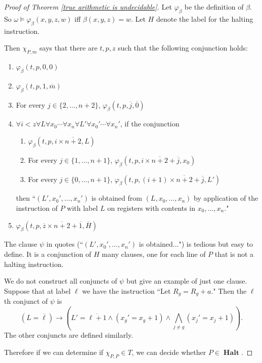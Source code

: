 \documentclass[12pt]{report}
\DeclareMathOperator{\Halt}{\mathbf{Halt}}
\theoremstyle{definition}
\begin{document}
\begin{proof}[Proof of Theorem \ref{true arithmetic is undecidable}]
Let $\varphi_\beta$ be the definition of $\beta$. So $\omega \models \varphi_\beta(x, y, z, w)$ iff $\beta(x, y, z) = w$. Let $H$ denote the label for the halting instruction.

Then $\chi_{P,m}$ says that there are $t,p,z$ such that the following conjunction holds:
\begin{enumerate}
\item $\varphi_\beta(t, p, 0, 0)$
\item $\varphi_\beta(t, p, 1, \overline m)$
\item For every $j \in \{2, \dots, n+2\}$, $\varphi_\beta(t, p, \overline j, \overline 0)$
\item $\forall i < z \forall L \forall x_0 \cdots \forall x_n \forall L' \forall x_0' \cdots \forall x_n'$, if the conjunction
\begin{enumerate}
\item $\varphi_\beta(t, p, i \times \overline{n+2}, L)$
\item For every $j \in \{1, \dots, n+1\}$, $\varphi_\beta(t, p, i \times \overline{n+2} + \overline j, x_0)$
\item For every $j \in \{0, \dots, n+1\}$, $\varphi_\beta(t, p, (i+1) \times \overline{n+2} + \overline j, L')$
\end{enumerate}
then ``$(L', x_0', \dots, x_n')$ is obtained from $(L, x_0, \dots, x_n)$ by application of the instruction of $P$ with label $L$ on registers with contents in $x_0, \dots, x_n$."
\item $\varphi_\beta(t, p, \overline z \times \overline{n+2} + \overline 1, \overline H)$
\end{enumerate}
The clause $\psi$ in quotes (``$(L', x_0', \dots, x_n')$ is obtained...") is tedious but easy to define. It is a conjunction of $H$ many clauses, one for each line of $P$ that is not a halting instruction.

We do not construct all conjuncts of $\psi$ but give an example of just one clause. Suppose that at label $\ell$ we have the instruction ``Let $R_g = R_g + a$." Then the $\ell$th conjunct of $\psi$ is
$$(L = \overline \ell) \to \left(L' = \overline{\ell + 1} \wedge (x_g' = x_g + 1) \wedge \bigwedge_{j \neq g} (x_j' = x_j + 1)\right).$$
The other conjuncts are defined similarly.

Therefore if we can determine if $\chi_{P,P} \in T$, we can decide whether $P \in \Halt$.
\end{proof}
\end{document}
